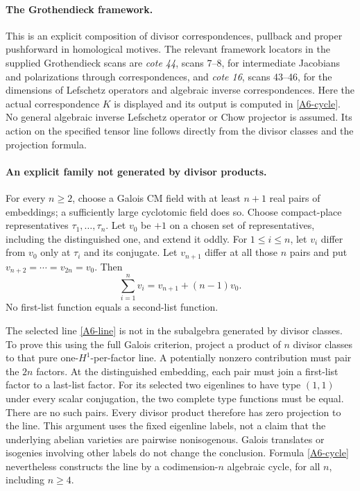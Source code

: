 \documentclass[11pt]{article}
\theoremstyle{definition}\newtheorem{definition}[theorem]{Definition}\newtheorem{remark}[theorem]{Remark}
\begin{document}
\paragraph{The Grothendieck framework.}
This is an explicit composition of divisor correspondences,
pullback and proper pushforward in homological motives. The
relevant framework locators in the supplied Grothendieck scans
are \emph{cote 44}, scans 7--8, for intermediate Jacobians and
polarizations through correspondences, and \emph{cote 16},
scans 43--46, for the dimensions of Lefschetz operators and
algebraic inverse correspondences. Here the actual correspondence
$K$ is displayed and its output is computed in
\eqref{A6-cycle}. No general algebraic inverse Lefschetz
operator or Chow projector is assumed. Its action on the
specified tensor line follows directly from the divisor classes
and the projection formula.

\paragraph{An explicit family not generated by divisor products.}
For every $n\geq2$, choose a Galois CM field with at least $n+1$
real pairs of embeddings; a sufficiently large cyclotomic field
does so. Choose compact-place representatives
$\tau_1,\ldots,\tau_n$. Let $v_0$ be $+1$ on a chosen set of
representatives, including the distinguished one, and extend it
oddly. For $1\leq i\leq n$, let $v_i$ differ from $v_0$ only at
$\tau_i$ and its conjugate. Let $v_{n+1}$ differ at all those
$n$ pairs and put $v_{n+2}=\cdots=v_{2n}=v_0$. Then
\[
 \sum_{i=1}^n v_i=v_{n+1}+(n-1)v_0.
\]
No first-list function equals a second-list function.

The selected line \eqref{A6-line} is not in the subalgebra generated
by divisor classes. To prove this using the full Galois criterion,
project a product of $n$ divisor classes to that pure
one-$H^1$-per-factor line. A potentially nonzero contribution must
pair the $2n$ factors. At the distinguished embedding, each pair
must join a first-list factor to a last-list factor. For its selected
two eigenlines to have type $(1,1)$ under every scalar conjugation,
the two complete type functions must be equal. There are no such
pairs. Every divisor product therefore has zero projection to the
line. This argument uses the fixed eigenline labels, not a claim
that the underlying abelian varieties are pairwise nonisogenous.
Galois translates or isogenies involving other labels do not change
the conclusion. Formula \eqref{A6-cycle} nevertheless constructs
the line by a codimension-$n$ algebraic cycle, for all $n$, including
$n\geq4$.
\end{document}
